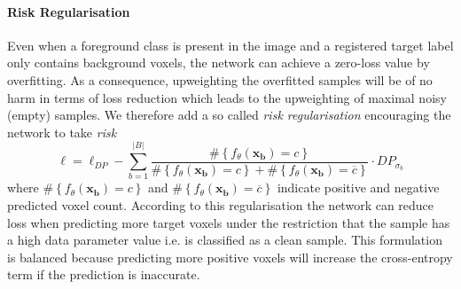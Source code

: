     \paragraph{\textbf{Risk Regularisation}}
        \label{sec:regularization}
        Even when a foreground class is present in the image and a registered target label only contains background voxels, the network can achieve a zero-loss value by overfitting. As a consequence, upweighting the overfitted samples will be of no harm in terms of loss reduction which leads to the upweighting of maximal noisy (empty) samples.
        We therefore add a so called \emph{risk regularisation} encouraging the network to take \emph{risk}
        \begin{equation}
            \label{eq:regularization}
            \ell = \ell_{DP} - \sum_{b=1}^{\lvert B \rvert}
            \frac{\#\left\{f_\theta\left(\mathbf{x_b}\right) = c\right\}}{\#\left\{f_\theta\left(\mathbf{x_b}\right) = c\right\} + \#\left\{f_\theta\left(\mathbf{x_b}\right) = \overline{c}\right\}} \cdot DP_{\sigma_{b}}
        \end{equation}
        where \(\#\left\{f_\theta\left(\mathbf{x_b}\right) = c\right\}\) and \(\#\left\{f_\theta\left(\mathbf{x_b}\right) = \overline{c}\right\}\) indicate positive and negative predicted voxel count. According to this regularisation the network can reduce loss when predicting more target voxels under the restriction that the sample has a high data parameter value i.e. is classified as a clean sample. This formulation is balanced because predicting more positive voxels will increase the cross-entropy term if the prediction is inaccurate.
    \newpage
